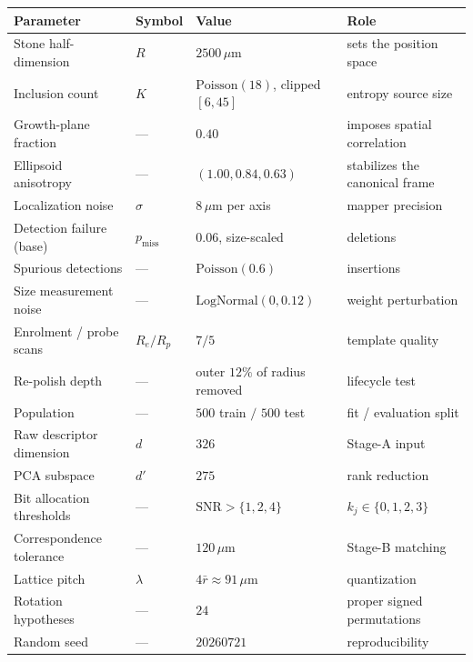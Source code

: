 \documentclass[10pt,twocolumn]{article}
\theoremstyle{remark}
\begin{document}
\begin{table}[H]
\centering
\small
\setlength{\tabcolsep}{8pt}
\renewcommand{\arraystretch}{1.15}
\begin{tabular}{llll}
\toprule
Parameter & Symbol & Value & Role \\
\midrule
Stone half-dimension        & $R$              & $2500\,\mu$m & sets the position space \\
Inclusion count             & $K$              & $\mathrm{Poisson}(18)$, clipped $[6,45]$ & entropy source size \\
Growth-plane fraction       & ---              & $0.40$ & imposes spatial correlation \\
Ellipsoid anisotropy        & ---              & $(1.00, 0.84, 0.63)$ & stabilizes the canonical frame \\
Localization noise          & $\sigma$         & $8\,\mu$m per axis & mapper precision \\
Detection failure (base)    & $p_{\mathrm{miss}}$ & $0.06$, size-scaled & deletions \\
Spurious detections         & ---              & $\mathrm{Poisson}(0.6)$ & insertions \\
Size measurement noise      & ---              & $\mathrm{LogNormal}(0, 0.12)$ & weight perturbation \\
Enrolment / probe scans     & $R_e / R_p$      & $7 / 5$ & template quality \\
Re-polish depth             & ---              & outer $12\%$ of radius removed & lifecycle test \\
Population                  & ---              & $500$ train $/$ $500$ test & fit / evaluation split \\
Raw descriptor dimension    & $d$              & $326$ & Stage-A input \\
PCA subspace                & $d'$             & $275$ & rank reduction \\
Bit allocation thresholds   & ---              & $\mathrm{SNR} > \{1,2,4\}$ & $k_j \in \{0,1,2,3\}$ \\
Correspondence tolerance    & ---              & $120\,\mu$m & Stage-B matching \\
Lattice pitch               & $\lambda$        & $4\bar{r} \approx 91\,\mu$m & quantization \\
Rotation hypotheses         & ---              & $24$ & proper signed permutations \\
Random seed                 & ---              & $20260721$ & reproducibility \\
\bottomrule
\end{tabular}
\end{table}
\end{document}
